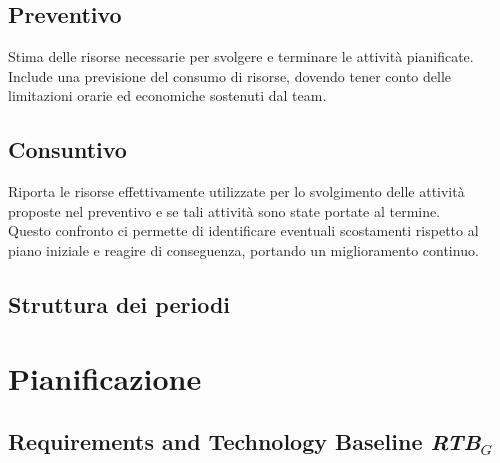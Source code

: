 \documentclass[12pt]{article}
\begin{document}
\subsection{Preventivo}
Stima delle risorse necessarie per svolgere e terminare le attività pianificate. Include una previsione del consumo di risorse, dovendo tener conto delle limitazioni orarie ed economiche sostenuti dal team.
\subsection{Consuntivo}
Riporta le risorse effettivamente utilizzate per lo svolgimento delle attività proposte nel preventivo e se tali attività sono state portate al termine.\\
Questo confronto ci permette di identificare eventuali scostamenti rispetto al piano iniziale e reagire di conseguenza, portando un miglioramento continuo.
\subsection{Struttura dei periodi}
\newpage
\section{Pianificazione}
\subsection{Requirements and Technology Baseline \textit{RTB}$_G$}
\end{document}
